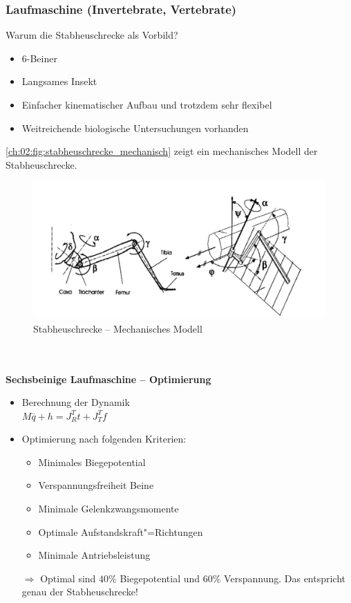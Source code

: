\subsubsection{Laufmaschine (Invertebrate, Vertebrate)}
Warum die Stabheuschrecke als Vorbild?
\begin{itemize}
	\item 6-Beiner
	\item Langsames Insekt
	\item Einfacher kinematischer Aufbau und trotzdem sehr flexibel
	\item Weitreichende biologische Untersuchungen vorhanden
\end{itemize}
\autoref{ch:02:fig:stabheuschrecke_mechanisch} zeigt ein mechanisches Modell der Stabheuschrecke. 
\begin{figure}
	\centering
	\includegraphics[width=\textwidth]{figures/stabheuschrecke_mechanisch.png}
	\caption{Stabheuschrecke -- Mechanisches Modell}
	\label{ch:02:fig:stabheuschrecke_mechanisch}
\end{figure}\\ \\
\textbf{Sechsbeinige Laufmaschine -- Optimierung}
\begin{itemize}
	\item Berechnung der Dynamik \\
	$M \stackrel{..}{q} + h = J^T_R t + J_T^T f$
	\item Optimierung nach folgenden Kriterien:
	\begin{itemize}
		\item Minimales Biegepotential
		\item Verspannungsfreiheit Beine
		\item Minimale Gelenkzwangsmomente
		\item Optimale Aufstandskraft"=Richtungen
		\item Minimale Antriebsleistung
	\end{itemize}
	\item[$\Rightarrow$] Optimal sind $40\%$ Biegepotential und $60\%$ Verspannung. Das entspricht genau der Stabheuschrecke!
\end{itemize}
